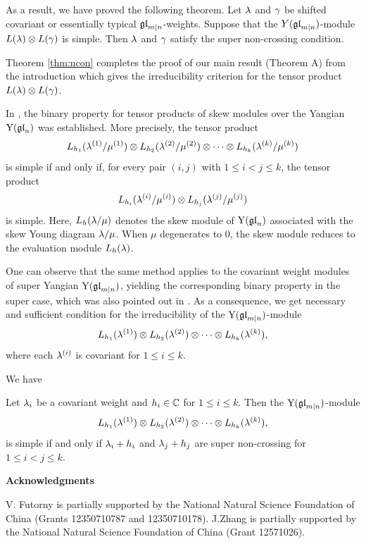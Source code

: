 \documentclass[12pt]{amsart}
\begin{document}
As a result, we have proved the following theorem.
\bth\label{thm:ncon}
Let $\lambda$ and $\gamma$ be shifted covariant or essentially typical $\mathfrak{gl}_{m|n}$-weights. Suppose that the $Y(\mathfrak{gl}_{m|n})$-module $L(\lambda)\otimes L(\gamma)$ is simple. Then  $\lambda$ and $\gamma$ satisfy the super non-crossing condition.
\eth

Theorem \ref{thm:ncon} completes the proof of our main result (Theorem A) from the introduction which gives the irreducibility criterion for the tensor product $L(\lambda)\otimes L(\gamma)$.

\bre\label{coro:multi}
In \cite{NT 2002}, the binary property for tensor products of skew modules over the Yangian ${\rm Y}(\mathfrak{gl}_n)$ was established. More precisely, the tensor product
\[
L_{h_1}(\lambda^{(1)}\slash\mu^{(1)})\otimes
L_{h_2}(\lambda^{(2)}\slash\mu^{(2)})\otimes
\cdots\otimes
L_{h_k}(\lambda^{(k)}\slash\mu^{(k)})
\]
is simple if and only if, for every pair $(i, j)$ with $1\le i<j\le k$, the tensor product
\[
L_{h_i}(\lambda^{(i)}\slash\mu^{(i)})
\otimes
L_{h_j}(\lambda^{(j)}\slash\mu^{(j)})
\]
is simple.
Here, $L_h(\lambda\slash\mu)$ denotes the skew module of ${\rm Y}(\mathfrak{gl}_n)$ associated with the skew Young diagram $\lambda\slash\mu$. When $\mu$ degenerates to $0$, the skew module reduces to the evaluation module $L_h(\lambda)$.

One can observe that the same method applies to the covariant weight modules of super Yangian ${\rm Y}(\mathfrak{gl}_{m|n})$, yielding the corresponding binary property in the super case, which was also pointed out in \cite{LM 2021}. As a consequence, we get  necessary and sufficient condition for the irreducibility of the ${\rm Y}(\mathfrak{gl}_{m|n})$-module
\[
L_{h_1}(\lambda^{(1)})\otimes L_{h_2}(\lambda^{(2)})\otimes\cdots\otimes L_{h_k}(\lambda^{(k)}),
\]
where each $\lambda^{(i)}$ is covariant for $1\le i\le k$. \ere

We have

\bco[Theorem B]
Let $\lambda_i$ be a covariant weight and  $h_i\in \mathbb{C}$ for $1\leq i\leq k$.
Then the ${\rm Y}(\mathfrak{gl}_{m|n})$-module
\[
L_{h_1}(\lambda^{(1)})\otimes L_{h_2}(\lambda^{(2)})\otimes\cdots\otimes L_{h_k}(\lambda^{(k)}),
\]
is simple if and only if  $\lambda_i+h_i$ and $\lambda_j+h_j$ are super non-crossing for $1\leq i< j\leq k$.
\eco



\bigskip
\centerline{\bf Acknowledgments}
\medskip
V. Futorny is partially supported by  the National Natural Science Foundation of China (Grants 12350710787 and 12350710178). J.Zhang is partially supported by the National Natural Science Foundation of China (Grant 12571026).
\end{document}
